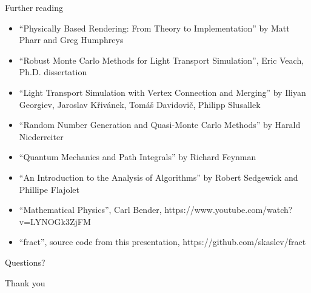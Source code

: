 \documentclass[pdf]
{beamer}
\begin{document}
\begin{frame}{Further reading}
  \small
  \begin{itemize}
  \item ``Physically Based Rendering: From Theory to Implementation'' by Matt Pharr and Greg Humphreys
  \item ``Robust Monte Carlo Methods for Light Transport Simulation'', Eric Veach, Ph.D. dissertation
  \item ``Light Transport Simulation with Vertex Connection and Merging'' by Iliyan Georgiev, Jaroslav Křivánek, Tomáš Davidovič, Philipp Slusallek
  \item ``Random Number Generation and Quasi-Monte Carlo Methods'' by Harald Niederreiter
  \item ``Quantum Mechanics and Path Integrals'' by Richard Feynman
  \item ``An Introduction to the Analysis of Algorithms'' by Robert Sedgewick and Phillipe Flajolet
  \item ``Mathematical Physics'', Carl Bender, https://www.youtube.com/watch?v=LYNOGk3ZjFM
  \item ``fract'', source code from this presentation, https://github.com/skaslev/fract
  \end{itemize}
\end{frame}

\begin{frame}{Questions?}
\end{frame}

\begin{frame}{Thank you}
\end{frame}
\end{document}

